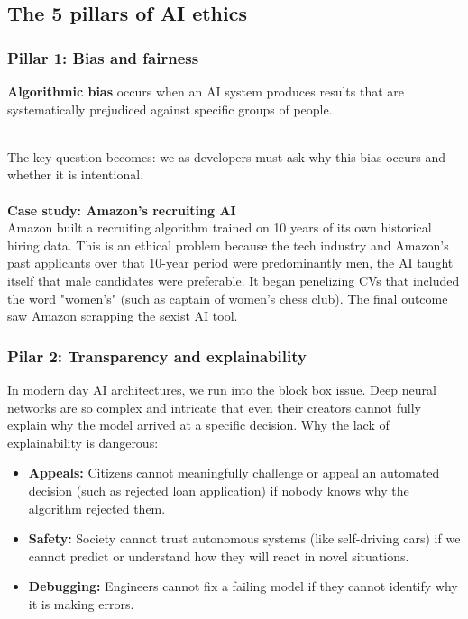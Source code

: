 \documentclass[11pt]{article}
\begin{document}
\subsection{The 5 pillars of AI ethics}
\subsubsection{Pillar 1: Bias and fairness}
\begin{definition}
\textbf{Algorithmic bias} occurs when an AI system produces results that are systematically prejudiced against specific groups of people.
\end{definition}
$\quad$\\[-1em]
The key question becomes: we as developers must ask why this bias occurs and whether it is intentional.
\\\\
\textbf{Case study: Amazon's recruiting AI} \\
Amazon built a recruiting algorithm trained on 10 years of its own historical hiring data. This is an ethical problem
because the tech industry and Amazon's past applicants over that 10-year period were predominantly men, the AI taught itself that male candidates were preferable.
It began penelizing CVs that included the word "women's" (such as captain of women's chess club).
The final outcome saw Amazon scrapping the sexist AI tool.
\subsubsection{Pilar 2: Transparency and explainability}
In modern day AI architectures, we run into the block box issue. Deep neural networks are so complex and intricate that even their creators cannot fully explain why the model arrived at a specific decision.
Why the lack of explainability is dangerous:
\begin{itemize}
    \item \textbf{Appeals:} Citizens cannot meaningfully challenge or appeal an automated decision (such as rejected loan application) if nobody knows why the algorithm rejected them.
    \item \textbf{Safety:} Society cannot trust autonomous systems (like self-driving cars) if we cannot predict or understand how they will react in novel situations.
    \item \textbf{Debugging:} Engineers cannot fix a failing model if they cannot identify why it is making errors. 
\end{itemize}
\end{document}
